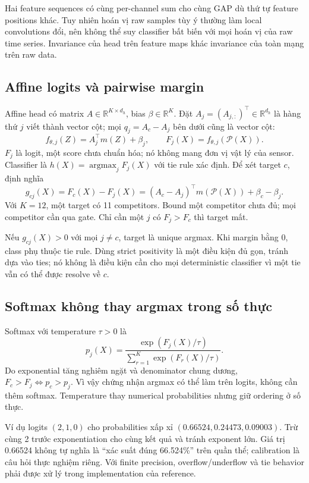 \documentclass[11pt,a4paper]{article}
\newcommand{\R}{\mathbb R}
\theoremstyle{definition}
\begin{document}
Hai feature sequences có cùng per-channel sum cho cùng GAP dù thứ tự
feature positions khác. Tuy nhiên hoán vị raw samples tùy ý thường làm
local convolutions đổi, nên không thể suy classifier bất biến với mọi
hoán vị của raw time series. Invariance của head trên feature maps khác
invariance của toàn mạng trên raw data.

\subsection{Affine logits và pairwise margin}
Affine head có matrix $A\in\R^{K\times d_h}$, bias
$\beta\in\R^K$. Đặt $A_j=(A_{j,:})^\top\in\R^{d_h}$ là hàng thứ $j$
viết thành vector cột; mọi $q_j=A_c-A_j$ bên dưới cũng là vector cột:
\begin{equation}
f_{\theta,j}(Z)=A_j^\top m(Z)+\beta_j,\qquad
F_j(X)=f_{\theta,j}(\mathcal P(X)).
\end{equation}
$F_j$ là logit, một score chưa chuẩn hóa; nó không mang đơn vị vật lý
của sensor. Classifier là $h(X)=\operatorname{argmax}_j F_j(X)$ với tie
rule xác định. Để xét target $c$, định nghĩa
\begin{equation}
g_{cj}(X)=F_c(X)-F_j(X)
=(A_c-A_j)^\top m(\mathcal P(X))+\beta_c-\beta_j.
\label{eq:margin}
\end{equation}
Với $K=12$, một target có 11 competitors. Bound một competitor chưa đủ;
mọi competitor cần qua gate. Chỉ cần một $j$ có $F_j>F_c$ thì target mất.

Nếu $g_{cj}(X)>0$ với mọi $j\ne c$, target là unique argmax. Khi margin
bằng 0, class phụ thuộc tie rule. Dùng strict positivity là một điều
kiện đủ gọn, tránh dựa vào ties; nó không là điều kiện cần cho mọi
deterministic classifier vì một tie vẫn có thể được resolve về $c$.

\subsection{Softmax không thay argmax trong số thực}
Softmax với temperature $\tau>0$ là
\begin{equation}
p_j(X)=\frac{\exp(F_j(X)/\tau)}{\sum_{r=1}^K\exp(F_r(X)/\tau)}.
\end{equation}
Do exponential tăng nghiêm ngặt và denominator chung dương,
$F_c>F_j\Leftrightarrow p_c>p_j$. Vì vậy chứng nhận argmax có thể làm
trên logits, không cần thêm softmax. Temperature thay numerical
probabilities nhưng giữ ordering ở số thực.

Ví dụ logits $(2,1,0)$ cho probabilities xấp xỉ
$(0.66524,0.24473,0.09003)$. Trừ cùng 2 trước exponentiation cho cùng
kết quả và tránh exponent lớn. Giá trị 0.66524 không tự nghĩa là
``xác suất đúng 66.524\%'' trên quần thể; calibration là câu hỏi thực
nghiệm riêng. Với finite precision, overflow/underflow và tie behavior
phải được xử lý trong implementation của reference.
\end{document}
